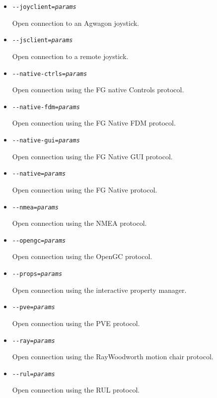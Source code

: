 {\begin{itemize}
  Open connection using the Garmin GPS protocol.

\item{\texttt{-$ $-joyclient={\it params}}}

  Open connection to an Agwagon joystick.

\item{\texttt{-$ $-jsclient={\it params}}}

  Open connection to a remote joystick.

\item{\texttt{-$ $-native-ctrls={\it params}}}

  Open connection using the FG native Controls protocol.

\item{\texttt{-$ $-native-fdm={\it params}}}

  Open connection using the FG Native FDM protocol.

\item{\texttt{-$ $-native-gui={\it params}}}

  Open connection using the FG Native GUI protocol.

\item{\texttt{-$ $-native={\it params}}}

  Open connection using the FG Native protocol.

\item{\texttt{-$ $-nmea={\it params}}}

  Open connection using the NMEA protocol.

\item{\texttt{-$ $-opengc={\it params}}}

  Open connection using the OpenGC protocol.

\item{\texttt{-$ $-props={\it params}}}

  Open connection using the interactive property manager.

\item{\texttt{-$ $-pve={\it params}}}

  Open connection using the PVE protocol.

\item{\texttt{-$ $-ray={\it params}}}

  Open connection using the RayWoodworth motion chair protocol.

\item{\texttt{-$ $-rul={\it params}}}

  Open connection using the RUL protocol.


\end{itemize}}
